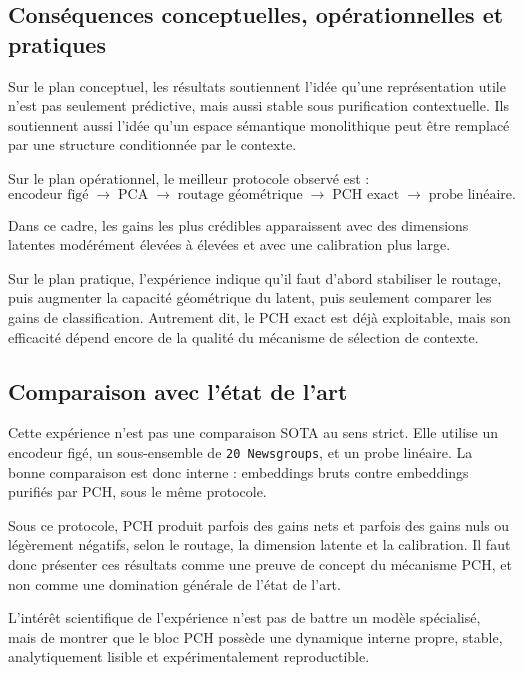 \documentclass[11pt,a4paper]{article}
\newcommand{\1}{\mathbf 1}
\begin{document}
\subsection{Conséquences conceptuelles, opérationnelles et pratiques}

Sur le plan conceptuel, les résultats soutiennent l’idée qu’une représentation utile n’est pas seulement prédictive, mais aussi stable sous purification contextuelle. Ils soutiennent aussi l’idée qu’un espace sémantique monolithique peut être remplacé par une structure conditionnée par le contexte.

Sur le plan opérationnel, le meilleur protocole observé est :
\[
\text{encodeur figé}
\;\to\;
\text{PCA}
\;\to\;
\text{routage géométrique}
\;\to\;
\text{PCH exact}
\;\to\;
\text{probe linéaire}.
\]

Dans ce cadre, les gains les plus crédibles apparaissent avec des dimensions latentes modérément élevées à élevées et avec une calibration plus large.

Sur le plan pratique, l’expérience indique qu’il faut d’abord stabiliser le routage, puis augmenter la capacité géométrique du latent, puis seulement comparer les gains de classification. Autrement dit, le PCH exact est déjà exploitable, mais son efficacité dépend encore de la qualité du mécanisme de sélection de contexte.

\subsection{Comparaison avec l’état de l’art}

Cette expérience n’est pas une comparaison SOTA au sens strict. Elle utilise un encodeur figé, un sous-ensemble de \texttt{20 Newsgroups}, et un probe linéaire. La bonne comparaison est donc interne : embeddings bruts contre embeddings purifiés par PCH, sous le même protocole.

Sous ce protocole, PCH produit parfois des gains nets et parfois des gains nuls ou légèrement négatifs, selon le routage, la dimension latente et la calibration. Il faut donc présenter ces résultats comme une preuve de concept du mécanisme PCH, et non comme une domination générale de l’état de l’art.

L’intérêt scientifique de l’expérience n’est pas de battre un modèle spécialisé, mais de montrer que le bloc PCH possède une dynamique interne propre, stable, analytiquement lisible et expérimentalement reproductible.
\end{document}
